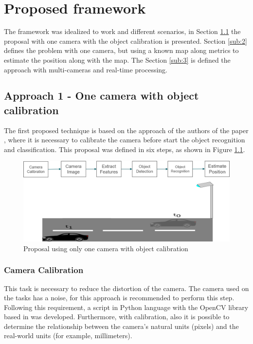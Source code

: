 
\chapter{Proposed framework}
\label{capitulo4}
The framework was idealized to work and different scenarios, in Section \ref{sub:1}  the proposal with one camera with the object calibration is presented. Section \ref{sub:2} defines the problem with one camera, but using a known map along metrics to estimate the position along with the map. The Section \ref{sub:3} is defined the approach with multi-cameras and real-time processing. 



\section{Approach 1 - One camera with object calibration}\label{sub:1}

The first proposed technique is based on the approach of the authors of the paper \cite{8678911}, where it is necessary to calibrate the camera before start the object recognition and classification. This proposal was defined in six steps, as shown in Figure \ref{fig:proposal1}.

\begin{figure}[H]
\centering
\includegraphics[width=\textwidth]{imagens/proposal1.png}
\caption{Proposal using only one camera with object calibration}
\label{fig:proposal1}
\end{figure}

\subsection{Camera Calibration}

This task is necessary to reduce the distortion of the camera. The camera used on the tasks has a noise, for this approach is recommended to perform this step. Following this requirement, a script in Python language with the OpenCV library based in \cite{zhu2020camera} was developed. Furthermore, with calibration, also it is possible to determine the relationship between the camera's natural units (pixels) and the real-world units (for example, millimeters).

